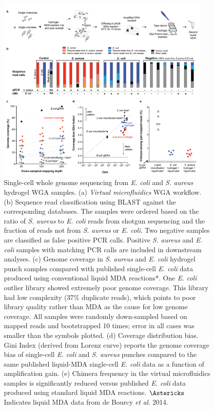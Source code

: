 \begin{figure}
\centering
\includegraphics[keepaspectratio,width=0.95\textwidth]{./figures/Thesis-16.png}
\caption[Single-cell whole genome sequencing from \textit{E. coli} and \textit{S. aureus} hydrogel WGA samples.]{Single-cell whole genome sequencing from \textit{E. coli} and \textit{S. aureus} hydrogel WGA samples. (a) \textit{Virtual microfluidics} WGA workflow. (b) Sequence read classification using BLAST against the corresponding databases. The samples were ordered based on the ratio of \textit{S. aureus}  to \textit{E. coli}  reads from shotgun sequencing and the fraction of reads not from \textit{S. aureus}  or \textit{E. coli}. Two negative samples are classified as false positive PCR calls. Positive \textit{S. aureus}  and \textit{E. coli}  samples with matching PCR calls are included in downstream analyses. (c) Genome coverage in \textit{S. aureus}  and \textit{E. coli}  hydrogel punch samples compared with published single-cell \textit{E. coli} data produced using conventional liquid MDA reactions*. One \textit{E. coli}  outlier library showed extremely poor genome coverage. This library had low complexity (37\% duplicate reads), which points to poor library quality rather than MDA as the cause for low genome coverage. All samples were randomly down-sampled based on mapped reads and bootstrapped 10 times; error in all cases was smaller than the symbols plotted. (d) Coverage distribution bias. Gini Index (derived from Lorenz curve) reports the genome coverage bias of single-cell \textit{E. coli}  and \textit{S. aureus}  punches compared to the same published liquid-MDA single-cell \textit{E. coli}  data as a function of amplification gain. (e) Chimera frequency in the virtual microfluidics samples is significantly reduced versus published \textit{E. coli}  data produced using standard liquid MDA reactions. $\Astericks$ Indicates liquid MDA data from de Bourcy \textit{et al.} 2014.}
\label{fig:ESMDA}
\end{figure}

